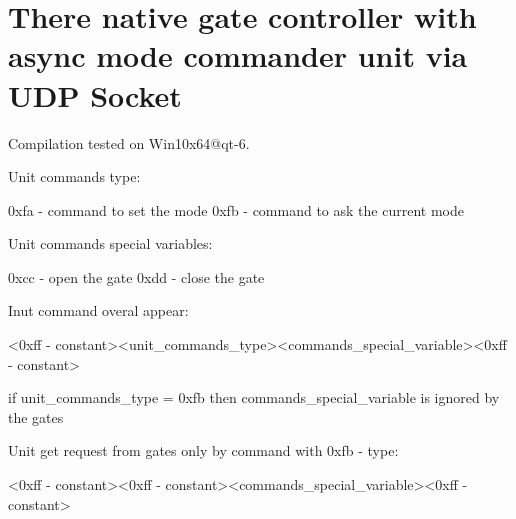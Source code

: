 \chapter{There native gate controller with async mode commander unit via UDP Socket}
\hypertarget{md_readme}{}\label{md_readme}
\label{md_readme_autotoc_md0}%
%


Compilation tested on Win10x64@qt-\/6.

Unit commands type\+: \begin{DoxyVerb}0xfa - command to set the mode
0xfb - command to ask the current mode
\end{DoxyVerb}


Unit commands special variables\+: \begin{DoxyVerb}0xcc - open the gate
0xdd - close the gate
\end{DoxyVerb}


Inut command overal appear\+: \begin{DoxyVerb}<0xff - constant><unit_commands_type><commands_special_variable><0xff - constant>
\end{DoxyVerb}
 if unit\+\_\+commands\+\_\+type = 0xfb then commands\+\_\+special\+\_\+variable is ignored by the gates

Unit get request from gates only by command with 0xfb -\/ type\+: \begin{DoxyVerb}<0xff - constant><0xff - constant><commands_special_variable><0xff - constant>
\end{DoxyVerb}
 